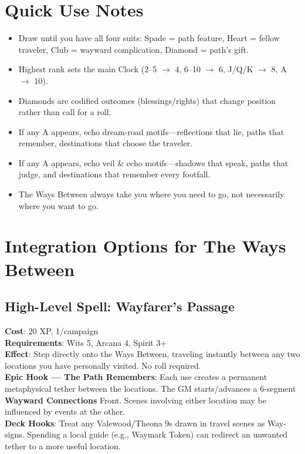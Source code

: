 \section*{Quick Use Notes}
\label{sec:ways-between-quick-use}
\begin{itemize}
\item Draw until you have all four suits: Spade = path feature, Heart = fellow traveler, Club = wayward complication, Diamond = path's gift.
\item Highest rank sets the main Clock (2--5 $\rightarrow$ 4, 6--10 $\rightarrow$ 6, J/Q/K $\rightarrow$ 8, A $\rightarrow$ 10).
\item Diamonds are codified outcomes (blessings/rights) that change position rather than call for a roll.
\item If any A appears, echo dream-road motifs---reflections that lie, paths that remember, destinations that choose the traveler.
\item If any A appears, echo veil \& echo motifs---shadows that speak, paths that judge, and destinations that remember every footfall.
\item The Ways Between always take you where you need to go, not necessarily where you want to go.
\end{itemize}

\section*{Integration Options for The Ways Between}
\label{sec:ways-between-integration}

\subsection*{High-Level Spell: Wayfarer's Passage}
\textbf{Cost}: 20 XP, 1/campaign \\
\textbf{Requirements}: Wits 5, Arcana 4, Spirit 3+ \\
\textbf{Effect}: Step directly onto the Ways Between, traveling instantly between any two locations you have personally visited. No roll required. \\
\textbf{Epic Hook --- The Path Remembers}: Each use creates a permanent metaphysical tether between the locations. The GM starts/advances a 6-segment \textbf{Wayward Connections} Front. Scenes involving either location may be influenced by events at the other. \\
\textbf{Deck Hooks}: Treat any Valewood/Theona 9s drawn in travel scenes as Way-signs. Spending a local guide (e.g., Waymark Token) can redirect an unwanted tether to a more useful location.

